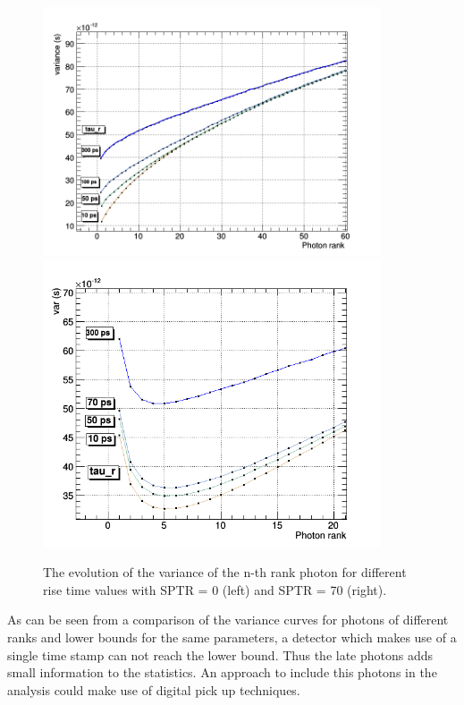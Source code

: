 \begin{figure}[htbp]
\begin{center}
\includegraphics[width=10cm]{../Pictures/Chapter_4/taur_rank_nosptr.png}
\includegraphics[width=10cm]{../Pictures/Chapter_4/tau_r_rank.png}
\end{center}
\caption[Rank variance - rise time]{The evolution of the variance of the n-th rank photon for different rise time values with SPTR = 0 (left) and SPTR = 70 (right).}
\label{fig:rise_rank}
\end{figure}
As can be seen from a comparison of the variance curves for photons of different ranks and lower bounds for the same parameters, a detector which makes use of a single time stamp can not reach the lower bound. Thus the late photons adds small information to the statistics. An approach to include this photons in the analysis could make use of digital pick up techniques. 

